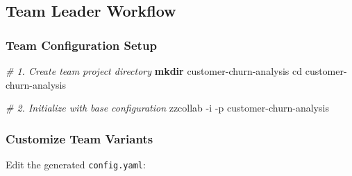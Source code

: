 \documentclass[
]{article}
\newenvironment{Shaded}{\begin{snugshade}}{\end{snugshade}}
\newcommand{\AttributeTok}[1]{\textcolor[rgb]{0.13,0.29,0.53}{#1}}
\newcommand{\BuiltInTok}[1]{#1}
\newcommand{\CommentTok}[1]{\textcolor[rgb]{0.56,0.35,0.01}{\textit{#1}}}
\newcommand{\ExtensionTok}[1]{#1}
\newcommand{\FunctionTok}[1]{\textcolor[rgb]{0.13,0.29,0.53}{\textbf{#1}}}
\newcommand{\NormalTok}[1]{#1}
\begin{document}
\subsection{Team Leader Workflow}\label{team-leader-workflow}

\subsubsection{Team Configuration Setup}\label{team-configuration-setup}

\begin{Shaded}
\begin{Highlighting}[]
\CommentTok{\# 1. Create team project directory}
\FunctionTok{mkdir}\NormalTok{ customer{-}churn{-}analysis}
\BuiltInTok{cd}\NormalTok{ customer{-}churn{-}analysis}

\CommentTok{\# 2. Initialize with base configuration}
\ExtensionTok{zzcollab} \AttributeTok{{-}i} \AttributeTok{{-}p}\NormalTok{ customer{-}churn{-}analysis}
\end{Highlighting}
\end{Shaded}

\subsubsection{Customize Team Variants}\label{customize-team-variants}

Edit the generated \texttt{config.yaml}:
\end{document}
